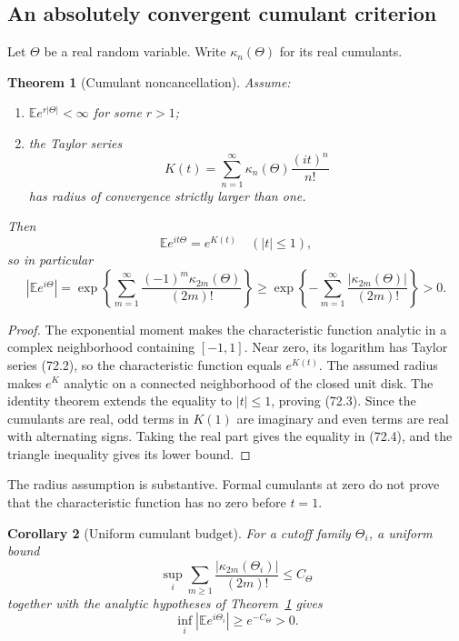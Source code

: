 \documentclass[11pt]{article}
\newtheorem{theorem}{Theorem}[section]
\newtheorem{corollary}[theorem]{Corollary}
\begin{document}
\subsection{An absolutely convergent cumulant criterion}

Let \(\Theta\) be a real random variable.  Write
\(\kappa_n(\Theta)\) for its real cumulants.

\begin{theorem}[Cumulant noncancellation]
\label{thm:v11v72-cumulant}
Assume:
\begin{enumerate}
\item \({\mathbb E}e^{r|\Theta|}<\infty\) for some \(r>1\);
\item the Taylor series
\[
                         K(t)=\sum_{n=1}^{\infty}
                       \kappa_n(\Theta)\frac{(it)^n}{n!}      \tag{72.2}
\]
has radius of convergence strictly larger than one.
\end{enumerate}
Then
\[
                         {\mathbb E}e^{it\Theta}=e^{K(t)}
                              \quad(|t|\le1),                  \tag{72.3}
\]
so in particular
\[
 \boxed{
 |{\mathbb E}e^{i\Theta}|
 =\exp\left\{\sum_{m=1}^{\infty}
          \frac{(-1)^m\kappa_{2m}(\Theta)}{(2m)!}\right\}
 \ge\exp\left\{-\sum_{m=1}^{\infty}
          \frac{|\kappa_{2m}(\Theta)|}{(2m)!}\right\}>0.}     \tag{72.4}
\]
\end{theorem}

\begin{proof}
The exponential moment makes the characteristic function analytic in
a complex neighborhood containing \([-1,1]\).  Near zero, its
logarithm has Taylor series (72.2), so the characteristic function
equals \(e^{K(t)}\).  The assumed radius makes \(e^{K}\) analytic on a
connected neighborhood of the closed unit disk.  The identity theorem
extends the equality to \(|t|\le1\), proving (72.3).  Since the
cumulants are real, odd terms in \(K(1)\) are imaginary and even terms
are real with alternating signs.  Taking the real part gives the
equality in (72.4), and the triangle inequality gives its lower bound.
\end{proof}

The radius assumption is substantive.  Formal cumulants at zero do not
prove that the characteristic function has no zero before \(t=1\).

\begin{corollary}[Uniform cumulant budget]
\label{cor:v11v72-uniform}
For a cutoff family \(\Theta_i\), a uniform bound
\[
                         \sup_i\sum_{m\ge1}
                         \frac{|\kappa_{2m}(\Theta_i)|}{(2m)!}
                              \le C_\Theta                    \tag{72.5}
\]
together with the analytic hypotheses of
Theorem~\ref{thm:v11v72-cumulant} gives
\[
                         \inf_i|{\mathbb E}e^{i\Theta_i}|
                              \ge e^{-C_\Theta}>0.             \tag{72.6}
\]
\end{corollary}
\end{document}
